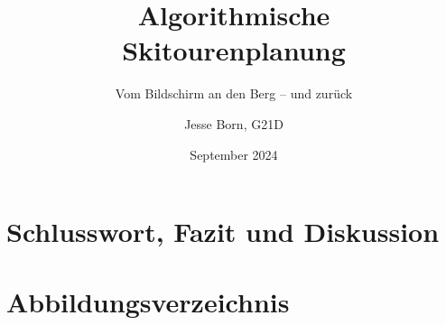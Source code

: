 \documentclass[a4paper]{scrarticle}
\title{\AKAfont\Huge\textcolor{AKSAcolor}{Algorithmische\\Skitourenplanung}}
\subtitle{Vom Bildschirm an den Berg – und zurück}
\author{Jesse Born, G21D}
\date{September 2024}
\begin{document}

\maketitle

\tableofcontents



\begin{multicols}{2}



\section{Schlusswort, Fazit und Diskussion}

\clearpage

\printbibliography
\clearpage
\section{Abbildungsverzeichnis}

\clearpage
\end{multicols}
\end{document}
